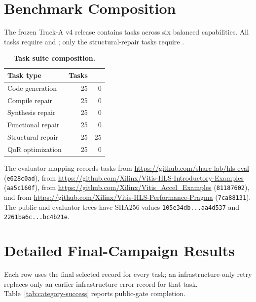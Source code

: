 \appendices

\section{Benchmark Composition}
\label{app:benchmark}

The frozen Track-A v4 release contains \CorpusTaskCount{} tasks across six
balanced capabilities. All tasks require \CSim{} and \Synth{}; only the
\RequiredCosimTaskCount{} structural-repair tasks require \CoSim{}.

\begin{table}[H]
  \caption{\textbf{Task suite composition.}}
  \label{tab:task-composition}
  \centering
  \small
  \begin{tabular}{lrr}
    \toprule
    Task type & Tasks & \CoSim{} \\
    \midrule
    Code generation & 25 & 0 \\
    Compile repair & 25 & 0 \\
    Synthesis repair & 25 & 0 \\
    Functional repair & 25 & 0 \\
    Structural repair & 25 & 25 \\
    QoR optimization & 25 & 0 \\
    \bottomrule
  \end{tabular}
\end{table}

The evaluator mapping records \HLSEvalTaskCount{} tasks from
\url{https://github.com/sharc-lab/hls-eval} (\texttt{e628c0ad}),
\IntroExampleTaskCount{} from
\url{https://github.com/Xilinx/Vitis-HLS-Introductory-Examples}
(\texttt{aa5c160f}), \AccelExampleTaskCount{} from
\url{https://github.com/Xilinx/Vitis_Accel_Examples}
(\texttt{81187602}), and \PerformancePragmaTaskCount{} from
\url{https://github.com/Xilinx/Vitis-HLS-Performance-Pragma}
(\texttt{7ca88131}). The public and evaluator trees have SHA256 values
\texttt{105e34db...aa4d537} and \texttt{2261ba6c...bc4b21e}.

\section{Detailed Final-Campaign Results}
\label{app:results}

Each row uses the final selected record for every task; an infrastructure-only
retry replaces only an earlier infrastructure-error record for that task.
Table~\ref{tab:category-success} reports public-gate completion.

